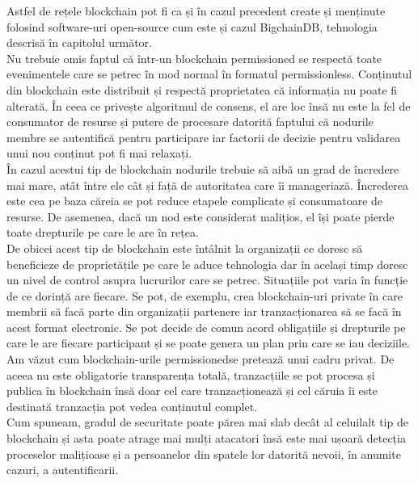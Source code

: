 \begin{enumerate}
    Astfel de rețele blockchain pot fi ca și în cazul precedent create și menținute folosind software-uri open-source cum este și cazul BigchainDB, tehnologia descrisă în capitolul următor.\\
    
    Nu trebuie omis faptul că într-un blockchain permissioned se respectă toate evenimentele care se petrec în mod normal în formatul permissionless. Conținutul din blockchain este distribuit și respectă proprietatea că informația nu poate fi alterată. În ceea ce privește algoritmul de consens, el are loc însă nu este la fel de consumator de resurse și putere de procesare datorită faptului că nodurile membre se autentifică pentru participare iar factorii de decizie pentru validarea unui nou conținut pot fi mai relaxați.\\
    
    În cazul acestui tip de blockchain nodurile trebuie să aibă un grad de încredere mai mare, atât între ele cât și față de autoritatea care îi manageriază. Încrederea este cea pe baza căreia se pot reduce etapele complicate și consumatoare de resurse. De asemenea, dacă un nod este considerat malițios, el își poate pierde toate drepturile pe care le are în rețea.\\
    
    De obicei acest tip de blockchain este întâlnit la organizații ce doresc să beneficieze de proprietățile pe care le aduce tehnologia dar în același timp doresc un nivel de control asupra lucrurilor care se petrec. Situațiile pot varia în funcție de ce dorință are fiecare. Se pot, de exemplu, crea blockchain-uri private în care membrii să facă parte din organizații partenere iar tranzacționarea să se facă în acest format electronic. Se pot decide de comun acord obligațiile și drepturile pe care le are fiecare participant și se poate genera un plan prin care se iau deciziile.\\
    
    Am văzut cum blockchain-urile permissionedse pretează unui cadru privat. De aceea nu este obligatorie transparența totală, tranzacțiile se pot procesa și publica în blockchain însă doar cel care tranzacționează și cel căruia îi este destinată tranzacția pot vedea conținutul complet.\\
    
    Cum spuneam, gradul de securitate poate părea mai slab decât al celuilalt tip de blockchain și asta poate atrage mai mulți atacatori însă este mai ușoară detecția proceselor malițioase și a persoanelor din spatele lor datorită nevoii, în anumite cazuri, a autentificarii.\\
    
\end{enumerate}

